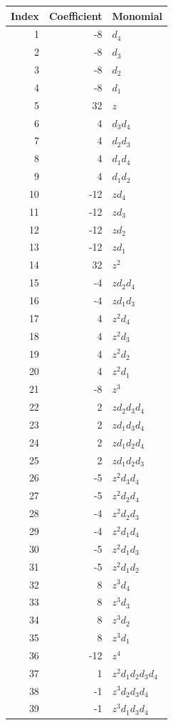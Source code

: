 \begin{longtable}{r r l}
\toprule
Index & Coefficient & Monomial\\
\midrule
\endhead
1 & -8 & $d_4$\\
2 & -8 & $d_3$\\
3 & -8 & $d_2$\\
4 & -8 & $d_1$\\
5 & 32 & $z$\\
6 & 4 & $d_3 d_4$\\
7 & 4 & $d_2 d_3$\\
8 & 4 & $d_1 d_4$\\
9 & 4 & $d_1 d_2$\\
10 & -12 & $z d_4$\\
11 & -12 & $z d_3$\\
12 & -12 & $z d_2$\\
13 & -12 & $z d_1$\\
14 & 32 & $z^{2}$\\
15 & -4 & $z d_2 d_4$\\
16 & -4 & $z d_1 d_3$\\
17 & 4 & $z^{2} d_4$\\
18 & 4 & $z^{2} d_3$\\
19 & 4 & $z^{2} d_2$\\
20 & 4 & $z^{2} d_1$\\
21 & -8 & $z^{3}$\\
22 & 2 & $z d_2 d_3 d_4$\\
23 & 2 & $z d_1 d_3 d_4$\\
24 & 2 & $z d_1 d_2 d_4$\\
25 & 2 & $z d_1 d_2 d_3$\\
26 & -5 & $z^{2} d_3 d_4$\\
27 & -5 & $z^{2} d_2 d_4$\\
28 & -4 & $z^{2} d_2 d_3$\\
29 & -4 & $z^{2} d_1 d_4$\\
30 & -5 & $z^{2} d_1 d_3$\\
31 & -5 & $z^{2} d_1 d_2$\\
32 & 8 & $z^{3} d_4$\\
33 & 8 & $z^{3} d_3$\\
34 & 8 & $z^{3} d_2$\\
35 & 8 & $z^{3} d_1$\\
36 & -12 & $z^{4}$\\
37 & 1 & $z^{2} d_1 d_2 d_3 d_4$\\
38 & -1 & $z^{3} d_2 d_3 d_4$\\
39 & -1 & $z^{3} d_1 d_3 d_4$\\

\end{longtable}
